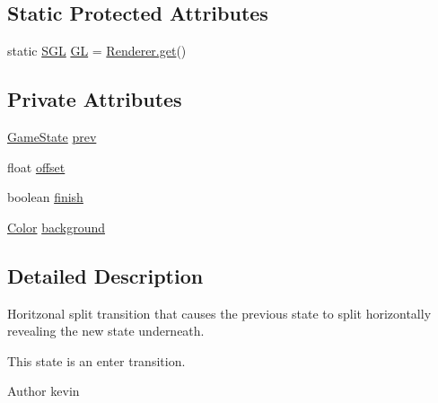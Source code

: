 \subsection*{Static Protected Attributes}
\begin{DoxyCompactItemize}
\item 
static \mbox{\hyperlink{interfaceorg_1_1newdawn_1_1slick_1_1opengl_1_1renderer_1_1_s_g_l}{S\+GL}} \mbox{\hyperlink{classorg_1_1newdawn_1_1slick_1_1state_1_1transition_1_1_horizontal_split_transition_aaceecb1455b0610ec5366dda0247bcce}{GL}} = \mbox{\hyperlink{classorg_1_1newdawn_1_1slick_1_1opengl_1_1renderer_1_1_renderer_abe742c3a7dfca67c6c01821d27087308}{Renderer.\+get}}()
\end{DoxyCompactItemize}
\subsection*{Private Attributes}
\begin{DoxyCompactItemize}
\item 
\mbox{\hyperlink{interfaceorg_1_1newdawn_1_1slick_1_1state_1_1_game_state}{Game\+State}} \mbox{\hyperlink{classorg_1_1newdawn_1_1slick_1_1state_1_1transition_1_1_horizontal_split_transition_a07a49cfa318899ffe21df13886c4f9f3}{prev}}
\item 
float \mbox{\hyperlink{classorg_1_1newdawn_1_1slick_1_1state_1_1transition_1_1_horizontal_split_transition_a7abff0f1ccb7041c5a0964ee3f06abec}{offset}}
\item 
boolean \mbox{\hyperlink{classorg_1_1newdawn_1_1slick_1_1state_1_1transition_1_1_horizontal_split_transition_a87c270ce19c400ee49306ba1c1fc9e63}{finish}}
\item 
\mbox{\hyperlink{classorg_1_1newdawn_1_1slick_1_1_color}{Color}} \mbox{\hyperlink{classorg_1_1newdawn_1_1slick_1_1state_1_1transition_1_1_horizontal_split_transition_a9f2e988c706773e93ad1472d85c5b229}{background}}
\end{DoxyCompactItemize}


\subsection{Detailed Description}
Horitzonal split transition that causes the previous state to split horizontally revealing the new state underneath.

This state is an enter transition.

\begin{DoxyAuthor}{Author}
kevin 
\end{DoxyAuthor}


